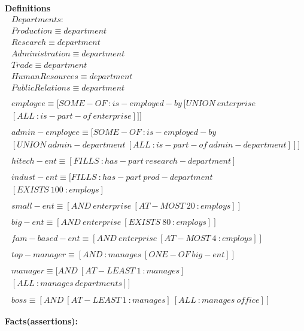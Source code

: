 \documentclass[11pt]{article}
\begin{document}
\textbf{Definitions}
\begin{align*}
Departments: \\
Production \equiv department \\ 
Research \equiv department \\
Administration \equiv department \\
Trade \equiv department \\
HumanResources \equiv department \\
PublicRelations \equiv department \\
\\
employee \equiv [SOME-OF\ :is-employed-by\ [UNION\ enterprise\\ 
[ALL\ :is-part-of\ enterprise]]] \\
\\
admin-employee \equiv [SOME-OF\ :is-employed-by\\
[UNION\ admin-department\ [ALL\ :is-part-of\ admin-department]]] \\ 
\\
hitech-ent \equiv [FILLS\ :has-part\ research-department] \\ 
\\
indust-ent \equiv [FILLS\ :has-part\ prod-department\\ 
[EXISTS\ 100\ :employs] \\
\\
small-ent \equiv [AND\ enterprise\ [AT-MOST\ 20\ :employs]] \\
\\
big-ent \equiv [AND\ enterprise\ [EXISTS\ 80\ :employs]] \\
\\
fam-based-ent \equiv [AND\ enterprise\ [AT-MOST\ 4\ :employs]] \\
\\
top-manager \equiv [AND\ :manages\ [ONE-OF\ big-ent]] \\ 
\\
manager \equiv [AND\ [AT-LEAST\ 1\ :manages]\\ [ALL\ :manages\ departments]] \\ 
\\
boss \equiv [AND\ [AT-LEAST\ 1\ :manages]\ [ALL\ :manages\ office]] 
\end{align*}

\textbf{Facts(assertions):}
\end{document}
